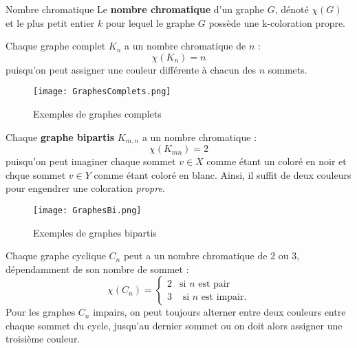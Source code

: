 \documentclass[16pt]{report}
\begin{document}
\begin{multicols*}{2}
            \begin{Definitionx}{Nombre chromatique}{}
                Le \textbf{nombre chromatique} d'un graphe $G$, dénoté $\chi(G)$ et le 
                plus petit entier $k$ pour lequel le graphe $G$ possède une k-coloration propre. 
            \end{Definitionx}
            

            \begin{note}{}{}
                Chaque graphe complet $K_n$ a un nombre chromatique de $n$ : 
                \[ \chi(K_n) = n \]
                puisqu'on peut assigner une couleur différente à chacun des $n$ sommets. 
            \end{note}

            \begin{figure}[H]
                \begin{center}
                    \texttt{[image: GraphesComplets.png]}
                \end{center}
                \caption{Exemples de graphes complets}
            \end{figure}
            

            \begin{note}{}{}
                Chaque \textbf{graphe bipartis}   $K_{m,n}$ a un nombre chromatique : 
                \[ \chi(K_{mn}) = 2 \]
                puisqu'on peut imaginer chaque sommet $v \in X$ comme étant un coloré en noir
                et chque sommet $v \in Y$ comme étant coloré en blanc. Ainsi, il suffit de deux 
                couleurs pour engendrer une coloration \textit{propre}.    
            \end{note}


            \begin{figure}[H]
                \begin{center}
                    \texttt{[image: GraphesBi.png]}
                \end{center}
                \caption{Exemples de graphes bipartis}
            \end{figure}


            \begin{note}{}{}
                Chaque graphe cyclique $C_n$ peut a un nombre chromatique de 2 ou 3, dépendamment 
                de son nombre de sommet :
                \begin{equation*}
                    \chi(C_n) = 
                \begin{cases}
                      2 & \text{si $n$ est pair} \\
                      3 & \text{ si $n$ est impair}. 
                    \end{cases}
                \end{equation*}
                Pour les graphes $C_n$ impairs, on peut toujours alterner entre deux couleurs entre chaque 
                sommet du cycle, jusqu'au dernier sommet ou on doit alors assigner une troisième couleur.
            \end{note}



\end{multicols*}
\end{document}
